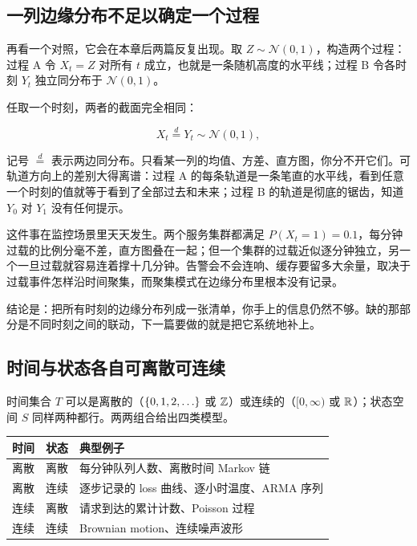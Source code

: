 \subsection{一列边缘分布不足以确定一个过程}

再看一个对照，它会在本章后两篇反复出现。取 \(Z \sim \mathcal N(0,1)\)，构造两个过程：过程 A 令 \(X_t = Z\) 对所有 \(t\) 成立，也就是一条随机高度的水平线；过程 B 令各时刻 \(Y_t\) 独立同分布于 \(\mathcal N(0,1)\)。

任取一个时刻，两者的截面完全相同：

\[
X_t \overset{d}{=} Y_t \sim \mathcal N(0,1),
\]

记号 \(\overset{d}{=}\) 表示两边同分布。只看某一列的均值、方差、直方图，你分不开它们。可轨道方向上的差别大得离谱：过程 A 的每条轨道是一条笔直的水平线，看到任意一个时刻的值就等于看到了全部过去和未来；过程 B 的轨道是彻底的锯齿，知道 \(Y_0\) 对 \(Y_1\) 没有任何提示。

这件事在监控场景里天天发生。两个服务集群都满足 \(P(X_t = 1) = 0.1\)，每分钟过载的比例分毫不差，直方图叠在一起；但一个集群的过载近似逐分钟独立，另一个一旦过载就容易连着撑十几分钟。告警会不会连响、缓存要留多大余量，取决于过载事件怎样沿时间聚集，而聚集模式在边缘分布里根本没有记录。

结论是：把所有时刻的边缘分布列成一张清单，你手上的信息仍然不够。缺的那部分是不同时刻之间的联动，下一篇要做的就是把它系统地补上。

\subsection{时间与状态各自可离散可连续}

时间集合 \(T\) 可以是离散的（\(\left\{0,1,2,\ldots\right\}\) 或 \(\mathbb{Z}\)）或连续的（\([0,\infty)\) 或 \(\mathbb{R}\)）；状态空间 \(S\) 同样两种都行。两两组合给出四类模型。

{\def\LTcaptype{none}
\begin{longtable}{@{}lll@{}}
\toprule\noalign{}
时间 & 状态 & 典型例子 \\
\midrule\noalign{}
\endhead
\bottomrule\noalign{}
\endlastfoot
离散 & 离散 & 每分钟队列人数、离散时间 Markov 链 \\
离散 & 连续 & 逐步记录的 loss 曲线、逐小时温度、ARMA 序列 \\
连续 & 离散 & 请求到达的累计计数、Poisson 过程 \\
连续 & 连续 & Brownian motion、连续噪声波形 \\
\end{longtable}
}

